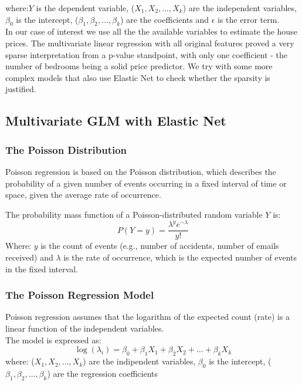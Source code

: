 \documentclass[a4paper, 8pt]{article}
\begin{document}
\begin{multicols}{2}
where:$Y$ is the dependent variable, ($X_1, X_2,\dots,X_k$) are the independent variables, $\beta_0$ is the intercept, ($\beta_1,\beta_2, \dots, \beta_k$) are the coefficients and $\epsilon$ is the error term.\\

In our case of interest we use all the the available variables to estimate the house prices.
The multivariate linear regression with all original features proved a very sparse interpretation from a p-value standpoint, with only one coefficient - the number of bedrooms being a solid price predictor. We try with some more complex models that also use Elastic Net to check whether the sparsity is justified.


\subsection{Multivariate GLM with Elastic Net}
\subsubsection{The Poisson Distribution}
Poisson regression is based on the Poisson distribution, which describes the probability of a given number of events occurring in a fixed interval of time or space, given the average rate of occurrence.

The probability mass function of a Poisson-distributed random variable $Y$ is:
\begin{equation}
P(Y=y)= \frac{\lambda^ye^{-\lambda}}{y!}
\end{equation}
Where: $y$ is the count of events (e.g., number of accidents, number of emails received) and $\lambda$ is the rate of occurrence, which is the expected number of events in the fixed interval.
\subsubsection{The Poisson Regression Model}
Poisson regression assumes that the logarithm of the expected count (rate) is a linear function of the independent variables.\\
The model is expressed as:
\begin{equation}
\log(\lambda_i)=\beta_0+\beta_1X_1+\beta_2X_2+\dots+\beta_kX_k
\end{equation}
where: ($X_1, X_2,\dots,X_k$) are the indipendent variables, $\beta_0$ is the intercept, ($\beta_1,\beta_2, \dots, \beta_k$) are the regression coefficients

\end{multicols}
\end{document}
